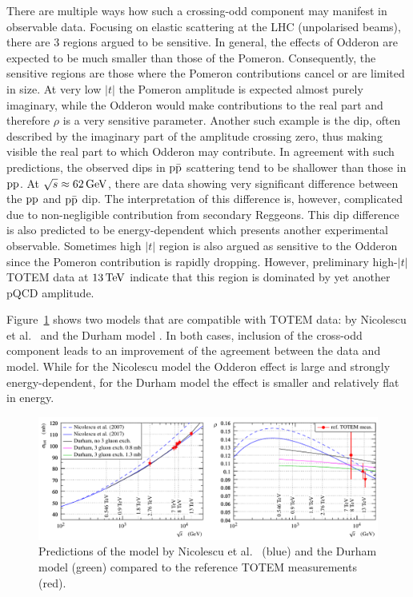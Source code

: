 There are multiple ways how such a crossing-odd component may manifest in observable data. Focusing on elastic scattering at the LHC (unpolarised beams), there are 3 regions argued to be sensitive. In general, the effects of Odderon are expected to be much smaller than those of the Pomeron. Consequently, the sensitive regions are those where the Pomeron contributions cancel or are limited in size. At very low $|t|$ the Pomeron amplitude is expected almost purely imaginary, while the Odderon would make contributions to the real part and therefore $\rho$ is a very sensitive parameter. Another such example is the dip, often described by the imaginary part of the amplitude crossing zero, thus making visible the real part to which Odderon may contribute. In agreement with such predictions, the observed dips in $\rm p\bar p$ scattering tend to be shallower than those in $\rm pp$. At $\sqrt s \approx 62\,{\rm GeV}$, there are data showing very significant difference between the $\rm pp$ and $\rm p\bar p$ dip. The interpretation of this difference is, however, complicated due to non-negligible contribution from secondary Reggeons. This dip difference is also predicted to be energy-dependent which presents another experimental observable. Sometimes high $|t|$ region is also argued as sensitive to the Odderon since the Pomeron contribution is rapidly dropping. However, preliminary high-$|t|$ TOTEM data at $13\,{\rm TeV}$ indicate that this region is dominated by yet another pQCD amplitude.

Figure~\ref{fig:match models} shows two models that are compatible with TOTEM data: by Nicolescu et al.~\cite{nicolescu-2017} and the Durham model \cite{durham-2017-note}. In both cases, inclusion of the cross-odd component leads to an improvement of the agreement between the data and model. While for the Nicolescu model the Odderon effect is large and strongly energy-dependent, for the Durham model the effect is smaller and relatively flat in energy.

\begin{figure}
\vskip-5mm
\begin{center}
\includegraphics{fig/matching_models_si_tot_rho.pdf}
\caption{%
Predictions of the model by Nicolescu et al.~\cite{nicolescu-2017} (blue) and the Durham model \cite{durham-2017-note} (green) compared to the reference TOTEM measurements (red). 
}
\label{fig:match models}
\end{center}
\end{figure}
